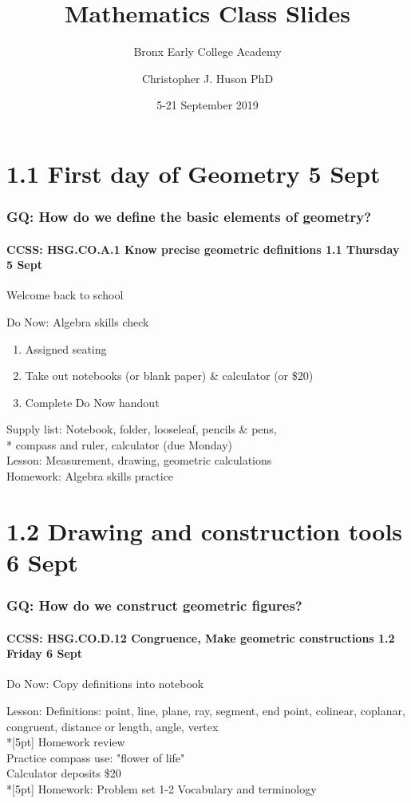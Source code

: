 \documentclass{beamer}
\title{Mathematics Class Slides}
\subtitle{Bronx Early College Academy}
\author{Christopher J. Huson PhD}
\date{5-21 September 2019}
\begin{document}
\frame{\titlepage}
\section[Outline]{}
\frame{\tableofcontents}

\section{1.1 First day of Geometry 5 Sept}
\frame
{
  \frametitle{GQ: How do we define the basic elements of geometry?}
  \framesubtitle{CCSS: HSG.CO.A.1 Know precise geometric definitions \hfill \alert{1.1 Thursday 5 Sept}}

  Welcome back to school
  \begin{block}{Do Now: Algebra skills check}
  \begin{enumerate}
      \item Assigned seating
      \item Take out notebooks (or blank paper) \& calculator (or \$20)
      \item Complete Do Now handout
  \end{enumerate}
  \end{block}
  Supply list: Notebook, folder, looseleaf, pencils \& pens, \\*
  compass and ruler, calculator \alert{(due Monday)} \\
  Lesson: Measurement, drawing, geometric calculations \\
  Homework: Algebra skills practice
}

\section{1.2 Drawing and construction tools 6 Sept}
\frame
{
  \frametitle{GQ: How do we construct geometric figures?}
  \framesubtitle{CCSS: HSG.CO.D.12 Congruence, Make geometric constructions  \hfill \alert{1.2 Friday 6 Sept}}

  \begin{block}{Do Now: Copy definitions into notebook}
  \end{block}
  Lesson: Definitions: point, line, plane, ray, segment, end point, colinear, coplanar, congruent, distance or length, angle, vertex \\*[5pt]
  Homework review\\
  Practice compass use: "flower of life"\\
  Calculator deposits \$20 \\*[5pt]
  Homework: Problem set 1-2 Vocabulary and terminology
}
\end{document}
